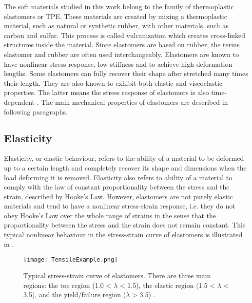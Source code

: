 The soft materials studied in this work belong to the family of thermoplastic elastomers or TPE. These materials are created by mixing a thermoplastic material, such as natural or synthetic rubber, with other materials, such as carbon and sulfur. This process is called vulcanization which creates cross-linked structures inside the material. Since elastomers are based on rubber, the terms elastomer and rubber are often used interchangeably. Elastomers are known to have nonlinear stress response, low stiffness and to achieve high deformation lengths. Some elastomers can fully recover their shape after stretched many times their length. They are also known to exhibit both elastic and viscoelastic properties. The latter means the stress response of elastomers is also time-dependent \cite{Bauman2008}. The main mechanical properties of elastomers are described in following paragraphs.

\subsection{Elasticity}

Elasticity, or elastic behaviour, refers to the ability of a material to be deformed up to a certain length and completely recover its shape and dimensions when the load deforming it is removed. Elasticity also refers to ability of a material to comply with the law of constant proportionality between the stress and the strain, described by Hooke's Law. However, elastomers are not purely elastic materials and tend to have a nonlinear stress-strain response, i.e. they do not obey Hooke's Law over the whole range of strains in the sense that the proportionality between the stress and the strain does not remain constant. This typical nonlinear behaviour in the stress-strain curve of elastomers is illustrated in .

\begin{figure}[hbt!]
    \centering
    \texttt{[image: TensileExample.png]}
    \caption[Typical stress-strain curve of elastomers. There are three main regions: the toe region (1.0 < $\lambda$ < 1.5), the elastic region (1.5 < $\lambda$ < 3.5), and the yield/failure region ($\lambda$ > 3.5).]{Typical stress-strain curve of elastomers. There are three main regions: the toe region (1.0 < $\lambda$ < 1.5), the elastic region (1.5 < $\lambda$ < 3.5), and the yield/failure region ($\lambda$ > 3.5) \cite{Bauman2008}.}
    \label{fig:tensile}
\end{figure}


